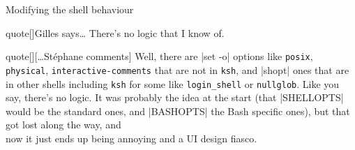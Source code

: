 \begin{frame}{Modifying the shell behaviour}
\begin{onlyenv}
\begin{varblock}{quote}[\textwidth]{Gilles says\ldots}
            \alert{There's no logic that I know of.}
        \end{varblock}
        \vspace{-2mm}
        \begin{varblock}{quote}[\textwidth]{}[\ldots{}St\'ephane comments]
            \footnotesize
            Well, there are \textnormal{\bash|set -o|}  options like \textnormal{\texttt{posix}}, \textnormal{\texttt{physical}}, \textnormal{\texttt{interactive-comments}} that are not in \textnormal{\texttt{ksh}}, and \textnormal{\bash|shopt|} ones that are in other shells including \textnormal{\texttt{ksh}} for some like \textnormal{\texttt{login\_shell}} or \textnormal{\texttt{nullglob}}.
            Like you say, there's no logic.
            It was probably the idea at the start (that \textnormal{\bash|SHELLOPTS|} would be the standard ones, and \textnormal{\bash|BASHOPTS|} the Bash specific ones), but that got lost along the way, and\\
            \alert{now it just ends up being annoying and a UI design fiasco.}\\[-0.7em] ~
        \end{varblock}
    \end{onlyenv}
\end{frame}
